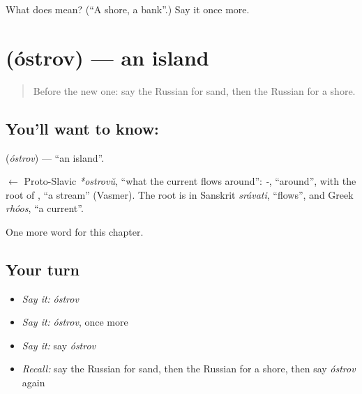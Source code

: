 \begin{tcolorbox}[breakable,colback=teal!4,colframe=teal!35!black,title={Before you move on}]
What does  mean? (\textquotedblleft{}A shore, a bank\textquotedblright{}.) Say it once more.
\end{tcolorbox}
\section[\texorpdfstring{\ru{остров} (óstrov)}{остров (óstrov)}]{ (óstrov) — an island}

\label{lesson:RU-C57-island}



\begin{quote}
Before the new one: say the Russian for sand, then the Russian for a shore.
\end{quote}

\subsection*{You'll want to know: }
\textbf{} (\emph{óstrov}) — \textquotedblleft{}an island\textquotedblright{}.

\begin{cousinweb}
\textbf{} $\leftarrow$ Proto-Slavic \emph{*ostrovŭ}, \textquotedblleft{}what the current flows around\textquotedblright{}: \emph{-}, \textquotedblleft{}around\textquotedblright{}, with the root of \emph{}, \textquotedblleft{}a stream\textquotedblright{} (Vasmer). The root is in Sanskrit \emph{srávati}, \textquotedblleft{}flows\textquotedblright{}, and Greek \emph{rhóos}, \textquotedblleft{}a current\textquotedblright{}.
\end{cousinweb}

\begin{grammarlens}[title={What you've built}]
One more word for this chapter.
\end{grammarlens}

\subsection*{Your turn}
\begin{itemize}
\raggedright
  \item \emph{Say it:} \emph{óstrov}
  \item \emph{Say it:} \emph{óstrov}, once more
  \item \emph{Say it:} say \emph{óstrov}
  \item \emph{Recall:} say the Russian for sand, then the Russian for a shore, then say \emph{óstrov} again
\end{itemize}

